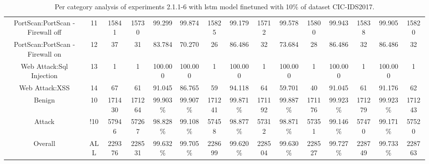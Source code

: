 \begin{table}[htb]
\begin{tabular}{@{}ccccccccccccccc@{}}
        PortScan:PortScan - Firewall off &  11 &  15841 &  15730 &  99.299 &  99.874 &  15825 &  99.179 &  15712 &  99.578 &  15800 &  99.943 &  15838 &  99.905 &  15820 \\
        PortScan:PortScan - Firewall on &  12 &  37 &  31 &  83.784 &  70.270 &  26 &  86.486 &  32 &  73.684 &  28 &  86.486 &  32 &  86.486 &  32 \\
        Web Attack:Sql Injection &  13 &  1 &  1 &  100.000 &  100.000 &  1 &  100.000 &  1 &  100.000 &  1 &  100.000 &  1 &  100.000 &  1 \\
        Web Attack:XSS &  14 &  67 &  61 &  91.045 &  86.765 &  59 &  94.118 &  64 &  59.701 &  40 &  91.045 &  61 &  91.176 &  62 \\
        Benign &  10 &  171430 &  171264 &  99.903\% &  99.907\% &  171241 &  99.871\% &  171192 &  99.887\% &  171176 &  99.923\% &  171279 &  99.923\% &  171243 \\
        Attack &  !10 &  57946 &  57267 &  98.828\% &  99.108\% &  57458 &  98.877\% &  57312 &  98.871\% &  57351 &  99.146\% &  57470 &  99.171\% &  57520 \\
        Overall &  ALL &  229376 &  228531 &  99.632\% &  99.705\% &  228699 &  99.620\% &  228504 &  99.630\% &  228527 &  99.727\% &  228749 &  99.733\% &  228763 \\
        \bottomrule
    \end{tabular}
    \caption{Per category analysis of experiments 2.1.1-6 with \gls{lstm} model finetuned with 10\% of dataset CIC-IDS2017.}
    \label{table:results:lstm:class_flows10}
\end{table}
